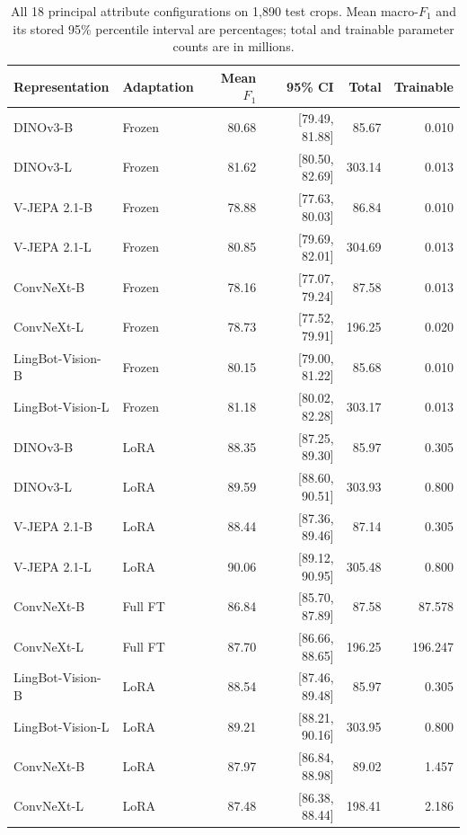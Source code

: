 \begin{table}[htbp]
\centering
\small
\caption{All 18 principal attribute configurations on 1,890 test crops. Mean macro-$F_1$ and its stored 95\% percentile interval are percentages; total and trainable parameter counts are in millions.}
\label{tab:ev-attributes}
\renewcommand{\arraystretch}{1.15}
\begin{tabularx}{\textwidth}{@{}>{\raggedright\arraybackslash}Xlrrrr@{}}
\toprule
Representation & Adaptation & Mean $F_1$ & 95\% CI & Total & Trainable \\
\midrule
DINOv3-B & Frozen & 80.68 & [79.49, 81.88] & 85.67 & 0.010 \\
DINOv3-L & Frozen & 81.62 & [80.50, 82.69] & 303.14 & 0.013 \\
V-JEPA 2.1-B & Frozen & 78.88 & [77.63, 80.03] & 86.84 & 0.010 \\
V-JEPA 2.1-L & Frozen & 80.85 & [79.69, 82.01] & 304.69 & 0.013 \\
ConvNeXt-B & Frozen & 78.16 & [77.07, 79.24] & 87.58 & 0.013 \\
ConvNeXt-L & Frozen & 78.73 & [77.52, 79.91] & 196.25 & 0.020 \\
LingBot-Vision-B & Frozen & 80.15 & [79.00, 81.22] & 85.68 & 0.010 \\
LingBot-Vision-L & Frozen & 81.18 & [80.02, 82.28] & 303.17 & 0.013 \\
DINOv3-B & LoRA & 88.35 & [87.25, 89.30] & 85.97 & 0.305 \\
DINOv3-L & LoRA & 89.59 & [88.60, 90.51] & 303.93 & 0.800 \\
V-JEPA 2.1-B & LoRA & 88.44 & [87.36, 89.46] & 87.14 & 0.305 \\
V-JEPA 2.1-L & LoRA & 90.06 & [89.12, 90.95] & 305.48 & 0.800 \\
ConvNeXt-B & Full FT & 86.84 & [85.70, 87.89] & 87.58 & 87.578 \\
ConvNeXt-L & Full FT & 87.70 & [86.66, 88.65] & 196.25 & 196.247 \\
LingBot-Vision-B & LoRA & 88.54 & [87.46, 89.48] & 85.97 & 0.305 \\
LingBot-Vision-L & LoRA & 89.21 & [88.21, 90.16] & 303.95 & 0.800 \\
ConvNeXt-B & LoRA & 87.97 & [86.84, 88.98] & 89.02 & 1.457 \\
ConvNeXt-L & LoRA & 87.48 & [86.38, 88.44] & 198.41 & 2.186 \\
\bottomrule
\end{tabularx}
\end{table}


